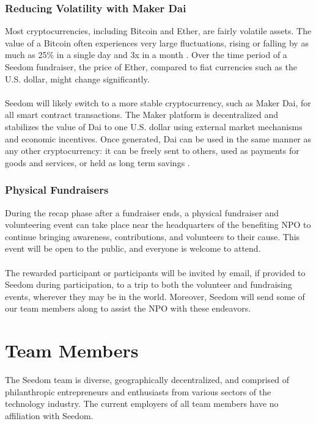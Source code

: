 \documentclass[11pt]{article}
\begin{document}
\subsubsection{Reducing Volatility with Maker Dai}

Most cryptocurrencies, including Bitcoin and Ether, are fairly volatile assets. The value of a Bitcoin often experiences very large fluctuations, rising or falling by as much as 25\% in a single day and 3x in a month \cite{10}. Over the time period of a Seedom fundraiser, the price of Ether, compared to fiat currencies such as the U.S. dollar, might change significantly.\\\\
Seedom will likely switch to a more stable cryptocurrency, such as Maker Dai, for all smart contract transactions. The Maker platform is decentralized and stabilizes the value of Dai to one U.S. dollar using external market mechanisms and economic incentives. Once generated, Dai can be used in the same manner as any other cryptocurrency: it can be freely sent to others, used as payments for goods and services, or
held as long term savings \cite{9}. 

\subsubsection{Physical Fundraisers}

During the recap phase after a fundraiser ends, a physical fundraiser and volunteering event can take place near the headquarters of the benefiting NPO to continue bringing awareness, contributions, and volunteers to their cause. This event will be open to the public, and everyone is welcome to attend.\\\\
The rewarded participant or participants will be invited by email, if provided to Seedom during participation, to a trip to both the volunteer and fundraising events, wherever they may be in the world. Moreover, Seedom will send some of our team members along to assist the NPO with these endeavors.

\section{Team Members}

The Seedom team is diverse, geographically decentralized, and comprised of philanthropic entrepreneurs and enthusiasts from various sectors of the technology industry. The current employers of all team members have no affiliation with Seedom.
\end{document}
